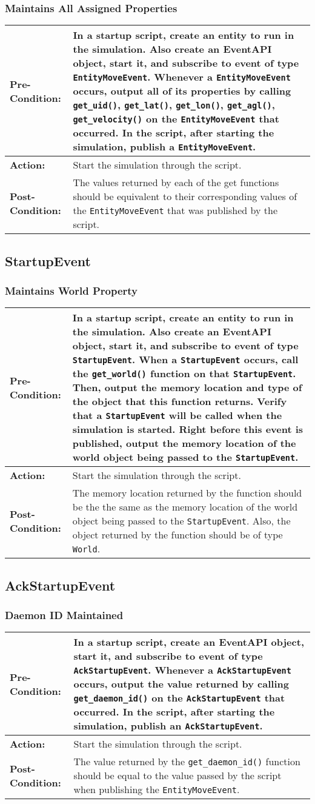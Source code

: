 \documentclass[titlepage]{article}
\newcommand{\testcase}[3]{
    \begin{center}
    \begin{tabular}{| l | p{0.7\textwidth}|}
        \hline
        \rowcolor[gray]{0.8}\textbf{Pre-Condition:} & #1 \\ \hline
        \textbf{Action:} & #2 \\ \hline
        \rowcolor[gray]{0.8}\textbf{Post-Condition:} & #3 \\ \hline
    \end{tabular}
    \end{center}
}
\begin{document}
\subsubsection{Maintains All Assigned Properties}
\testcase{In a startup script, create an entity to run in the simulation. Also create an EventAPI object, start it, and subscribe to event of type \texttt{EntityMoveEvent}. Whenever a \texttt{EntityMoveEvent} occurs, output all of its properties by calling \texttt{get\_uid()}, \texttt{get\_lat()}, \texttt{get\_lon()}, \texttt{get\_agl()}, \texttt{get\_velocity()} on the \texttt{EntityMoveEvent} that occurred. In the script, after starting the simulation, publish a \texttt{EntityMoveEvent}.}{Start the simulation through the script.}{The values returned by each of the get functions should be equivalent to their corresponding values of the \texttt{EntityMoveEvent} that was published by the script.}

\subsection{StartupEvent}
\subsubsection{Maintains World Property}
\testcase{In a startup script, create an entity to run in the simulation. Also create an EventAPI object, start it, and subscribe to event of type \texttt{StartupEvent}. When a \texttt{StartupEvent} occurs, call the \texttt{get\_world()} function on that \texttt{StartupEvent}. Then, output the memory location and type of the object that this function returns.  Verify that a \texttt{StartupEvent} will be called when the simulation is started. Right before this event is published, output the memory location of the world object being passed to the \texttt{StartupEvent}.}{Start the simulation through the script.}{The memory location returned by the function should be the the same as the memory location of the world object being passed to the \texttt{StartupEvent}. Also, the object returned by the function should be of type \texttt{World}.}

\subsection{AckStartupEvent}
\subsubsection{Daemon ID Maintained}
\testcase{In a startup script, create an EventAPI object, start it, and subscribe to event of type \texttt{AckStartupEvent}. Whenever a \texttt{AckStartupEvent} occurs, output the value returned by calling \texttt{get\_daemon\_id()} on the \texttt{AckStartupEvent} that occurred. In the script, after starting the simulation, publish an \texttt{AckStartupEvent}.}{Start the simulation through the script.}{The value returned by the \texttt{get\_daemon\_id()} function should be equal to the value passed by the script when publishing the \texttt{EntityMoveEvent}.}
\end{document}
